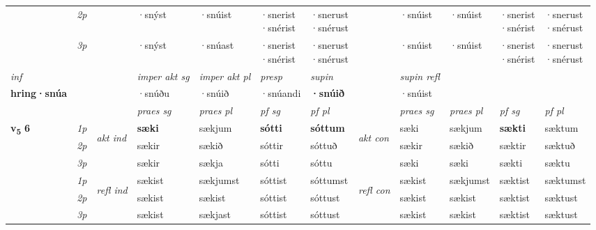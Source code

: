 \begin{longtable}[l]{X>{\footnotesize\itshape}llXXXXlXXXX}
 & 2p &  & ·snýst & ·snúist & \specialcell{·snerist\\  ·snérist} & \specialcell{·snerust\\  ·snérust} & &·snúist & ·snúist & \specialcell{·snerist\\  ·snérist} & \specialcell{·snerust\\  ·snérust} \\*
 & 3p  & & ·snýst & ·snúast & \specialcell{·snerist\\  ·snérist} & \specialcell{·snerust\\  ·snérust} & & ·snúist & ·snúist& \specialcell{·snerist\\  ·snérist} & \specialcell{·snerust\\  ·snérust} \\*
\cmidrule{4-7} \cmidrule{9-12}

   {\textit{inf}} & &  & \textit{imper akt sg} & \textit{imper akt pl}   & \textit{presp} & \textit{supin} && \textit{supin refl}  \\*
  {\textbf{hring\allowbreak ·snúa}} & && ·snúðu  & ·snúið   & ·snúandi &  \textbf{·snúið} && ·snúist  \\*

\midrule

 & &   & \textit{praes sg}  & \textit{praes pl}    & \textit{ pf sg} & \textit{pf pl} & & \textit{praes sg}  & \textit{praes pl}    & \textit{pf sg} & \textit{pf pl }  \\ \cmidrule{4-7} \cmidrule{9-12}
 \multirow{2}{*}{{{\textbf{v{\textsubscript{5}}} \Large{\textbf{6}}}}}  & 1p & \multirow{3}{*}{\begin{turn}{90}\textit{akt ind}\end{turn}} & \textbf{sæki} & sækjum & \textbf{sótti} & \textbf{sóttum} & \multirow{3}{*}{\begin{turn}{90}\textit{akt con}\end{turn}} &sæki & sækjum & \textbf{sækti} & sæktum\\*
 & 2p &  &  sækir  & sækið & sóttir & sóttuð & & sækir & sækið & sæktir & sæktuð \\*
 & 3p &  & sækir & sækja & sótti & sóttu & & sæki & sæki& sækti & sæktu \\*
\cmidrule{4-7} \cmidrule{9-12}
 & 1p & \multirow{3}{*}{\begin{turn}{90}\textit{refl ind}\end{turn}}  & sækist & sækjumst & sóttist & sóttumst & \multirow{3}{*}{\begin{turn}{90}\textit{refl con}\end{turn}}  &sækist & sækjumst & sæktist & sæktumst \\*
 & 2p &  & sækist & sækist & sóttist & sóttust & &sækist & sækist & sæktist & sæktust \\*
 & 3p  & & sækist & sækjast & sóttist & sóttust & & sækist & sækist& sæktist & sæktust \\*
\cmidrule{4-7} \cmidrule{9-12}


\end{longtable}
